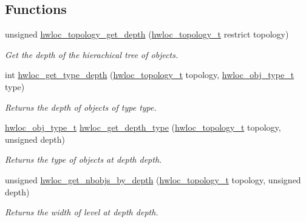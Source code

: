 \subsection*{Functions}
\begin{DoxyCompactItemize}
\item 
unsigned \hyperlink{group__hwlocality__information_ga3cc2255e237b751a6c8efa8703b3daf5}{hwloc\_\-topology\_\-get\_\-depth} (\hyperlink{group__hwlocality__topology_ga9d1e76ee15a7dee158b786c30b6a6e38}{hwloc\_\-topology\_\-t} restrict topology)
\begin{DoxyCompactList}\small\item\em Get the depth of the hierachical tree of objects. \item\end{DoxyCompactList}\item 
int \hyperlink{group__hwlocality__information_ga8bec782e21be313750da70cf7428b374}{hwloc\_\-get\_\-type\_\-depth} (\hyperlink{group__hwlocality__topology_ga9d1e76ee15a7dee158b786c30b6a6e38}{hwloc\_\-topology\_\-t} topology, \hyperlink{group__hwlocality__types_gacd37bb612667dc437d66bfb175a8dc55}{hwloc\_\-obj\_\-type\_\-t} type)
\begin{DoxyCompactList}\small\item\em Returns the depth of objects of type {\ttfamily type}. \item\end{DoxyCompactList}\item 
\hyperlink{group__hwlocality__types_gacd37bb612667dc437d66bfb175a8dc55}{hwloc\_\-obj\_\-type\_\-t} \hyperlink{group__hwlocality__information_ga8cc04ad9eb03b0b74d420adf8cc11ad2}{hwloc\_\-get\_\-depth\_\-type} (\hyperlink{group__hwlocality__topology_ga9d1e76ee15a7dee158b786c30b6a6e38}{hwloc\_\-topology\_\-t} topology, unsigned depth)
\begin{DoxyCompactList}\small\item\em Returns the type of objects at depth {\ttfamily depth}. \item\end{DoxyCompactList}\item 
unsigned \hyperlink{group__hwlocality__information_gab17065e3d53455973844568d9f21c72c}{hwloc\_\-get\_\-nbobjs\_\-by\_\-depth} (\hyperlink{group__hwlocality__topology_ga9d1e76ee15a7dee158b786c30b6a6e38}{hwloc\_\-topology\_\-t} topology, unsigned depth)
\begin{DoxyCompactList}\small\item\em Returns the width of level at depth {\ttfamily depth}. \item\end{DoxyCompactList}\item 

\end{DoxyCompactItemize}
